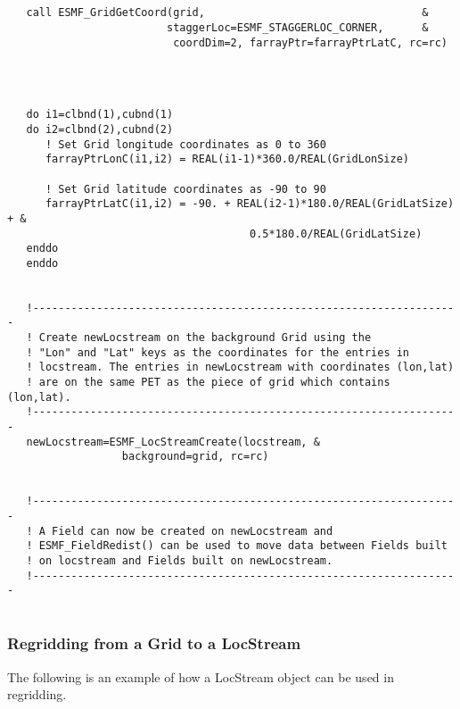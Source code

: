 
 \begin{verbatim}


   call ESMF_GridGetCoord(grid,                                  &
                         staggerLoc=ESMF_STAGGERLOC_CORNER,      &
                          coordDim=2, farrayPtr=farrayPtrLatC, rc=rc)

 
\end{verbatim}
 

 \begin{verbatim}

   do i1=clbnd(1),cubnd(1)
   do i2=clbnd(2),cubnd(2)
      ! Set Grid longitude coordinates as 0 to 360
      farrayPtrLonC(i1,i2) = REAL(i1-1)*360.0/REAL(GridLonSize)

      ! Set Grid latitude coordinates as -90 to 90
      farrayPtrLatC(i1,i2) = -90. + REAL(i2-1)*180.0/REAL(GridLatSize) + &
                                      0.5*180.0/REAL(GridLatSize)
   enddo
   enddo


   !-------------------------------------------------------------------
   ! Create newLocstream on the background Grid using the 
   ! "Lon" and "Lat" keys as the coordinates for the entries in 
   ! locstream. The entries in newLocstream with coordinates (lon,lat)
   ! are on the same PET as the piece of grid which contains (lon,lat). 
   !-------------------------------------------------------------------
   newLocstream=ESMF_LocStreamCreate(locstream, &
                  background=grid, rc=rc)


   !-------------------------------------------------------------------
   ! A Field can now be created on newLocstream and 
   ! ESMF_FieldRedist() can be used to move data between Fields built 
   ! on locstream and Fields built on newLocstream.
   !-------------------------------------------------------------------
 
\end{verbatim}
 

  \subsubsection{Regridding from a Grid to a LocStream}
  
   The following is an example of how a LocStream object can be used in regridding.
   
